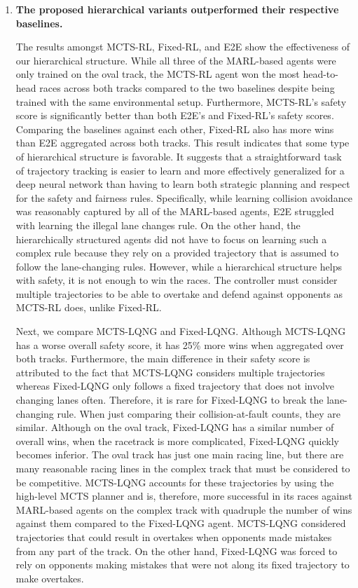 \begin{enumerate}[wide, labelindent=0pt, font=\bfseries]
\item \textbf{The proposed hierarchical variants outperformed their respective baselines.} 

The results amongst MCTS-RL, Fixed-RL, and E2E show the effectiveness of our hierarchical structure. While all three of the MARL-based agents were only trained on the oval track, the MCTS-RL agent won the most head-to-head races across both tracks compared to the two baselines despite being trained with the same environmental setup. Furthermore, MCTS-RL's safety score is significantly better than both E2E's and Fixed-RL's safety scores. Comparing the baselines against each other, Fixed-RL also has more wins than E2E aggregated across both tracks. This result indicates that some type of hierarchical structure is favorable. It suggests that a straightforward task of trajectory tracking is easier to learn and more effectively generalized for a deep neural network than having to learn both strategic planning and respect for the safety and fairness rules. Specifically, while learning collision avoidance was reasonably captured by all of the MARL-based agents, E2E struggled with learning the illegal lane changes rule. On the other hand, the hierarchically structured agents did not have to focus on learning such a complex rule because they rely on a provided trajectory that is assumed to follow the lane-changing rules. However, while a hierarchical structure helps with safety, it is not enough to win the races. The controller must consider multiple trajectories to be able to overtake and defend against opponents as MCTS-RL does, unlike Fixed-RL.

Next, we compare MCTS-LQNG and Fixed-LQNG. Although MCTS-LQNG has a worse overall safety score, it has 25\% more wins when aggregated over both tracks. Furthermore, the main difference in their safety score is attributed to the fact that MCTS-LQNG considers multiple trajectories whereas Fixed-LQNG only follows a fixed trajectory that does not involve changing lanes often. Therefore, it is rare for Fixed-LQNG to break the lane-changing rule. When just comparing their collision-at-fault counts, they are similar. Although on the oval track, Fixed-LQNG has a similar number of overall wins, when the racetrack is more complicated, Fixed-LQNG quickly becomes inferior. The oval track has just one main racing line, but there are many reasonable racing lines in the complex track that must be considered to be competitive. MCTS-LQNG accounts for these trajectories by using the high-level MCTS planner and is, therefore, more successful in its races against MARL-based agents on the complex track with quadruple the number of wins against them compared to the Fixed-LQNG agent. MCTS-LQNG considered trajectories that could result in overtakes when opponents made mistakes from any part of the track. On the other hand, Fixed-LQNG was forced to rely on opponents making mistakes that were not along its fixed trajectory to make overtakes. 


\end{enumerate}
